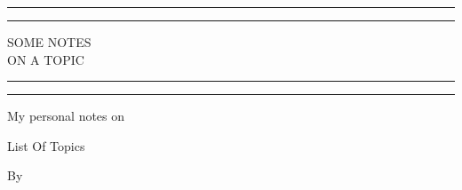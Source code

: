 \begin{titlepage} %

	\centering %
	
	\scshape %
	
	\vspace*{\baselineskip} %
	
	
	\rule{\textwidth}{1.6pt}\vspace*{-\baselineskip}\vspace*{2pt} %
	\rule{\textwidth}{0.4pt} %
	
	\vspace{0.75\baselineskip} %
	
	{\LARGE SOME NOTES\\ \Large ON A TOPIC\\} %
	
	\vspace{0.75\baselineskip} %
	
	\rule{\textwidth}{0.4pt}\vspace*{-\baselineskip}\vspace{3.2pt} %
	\rule{\textwidth}{1.6pt} %
	
	\vspace{2\baselineskip} %
	
	My personal notes on
	
	\vspace*{3\baselineskip} %
	
	List Of Topics
	
	\vspace*{3\baselineskip} %
	
	
	By
	
	\vspace{0.5\baselineskip} %
	

\end{titlepage}
